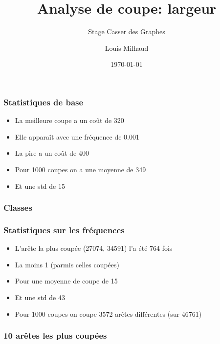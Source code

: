 \documentclass[aspectratio=169]{beamer}
\title{Analyse de coupe: largeur}
\subtitle{Stage Casser des Graphes}
\author{Louis Milhaud}
\institute{Complex Networks - LIP6}
\date{\today}
\begin{document}
    \begin{frame}
        \titlepage
    \end{frame}

    \begin{frame}
        \frametitle{Statistiques de base}

        \begin{itemize}
            \item La meilleure coupe a un coût de 320
            \item Elle apparaît avec une fréquence de 0.001
            \item La pire a un coût de 400
            \item Pour 1000 coupes on a une moyenne de 349
            \item Et une std de 15
        \end{itemize}
    
    \end{frame}

    \begin{frame}
        \frametitle{Classes}
    
        
    
    \end{frame}

    \begin{frame}
        \frametitle{Statistiques sur les fréquences}
        
        \begin{itemize}
            \item L'arête la plus coupée (27074, 34591) l'a été 764 fois
            \item La moins 1 (parmis celles coupées)
            \item Pour une moyenne de coupe de 15
            \item Et une std de 43
            \item Pour 1000 coupes on coupe 3572 arêtes différentes (sur 46761)
        \end{itemize}
    
    \end{frame}

    \begin{frame}
        \frametitle{10 arêtes les plus coupées}
    
        
    
    \end{frame}
\end{document}
